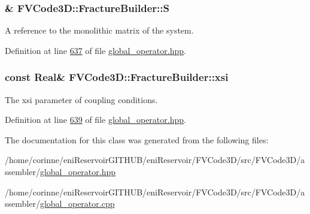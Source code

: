 \subsubsection[{\texorpdfstring{S}{S}}]{\& F\+V\+Code3\+D\+::\+Fracture\+Builder\+::S\hspace{0.3cm}{\ttfamily [private]}}\hypertarget{classFVCode3D_1_1FractureBuilder_a4863fe7c2507df5d6f30dbdac2a27c31}{}\label{classFVCode3D_1_1FractureBuilder_a4863fe7c2507df5d6f30dbdac2a27c31}


A reference to the monolithic matrix of the system. 



Definition at line \hyperlink{global__operator_8hpp_source_l00637}{637} of file \hyperlink{global__operator_8hpp_source}{global\+\_\+operator.\+hpp}.

\subsubsection[{\texorpdfstring{xsi}{xsi}}]{\setlength{\rightskip}{0pt plus 5cm}const {\bf Real}\& F\+V\+Code3\+D\+::\+Fracture\+Builder\+::xsi\hspace{0.3cm}{\ttfamily [private]}}\hypertarget{classFVCode3D_1_1FractureBuilder_add8696ef08b9dad08e62a0ef85a437b4}{}\label{classFVCode3D_1_1FractureBuilder_add8696ef08b9dad08e62a0ef85a437b4}


The xsi parameter of coupling conditions. 



Definition at line \hyperlink{global__operator_8hpp_source_l00639}{639} of file \hyperlink{global__operator_8hpp_source}{global\+\_\+operator.\+hpp}.



The documentation for this class was generated from the following files\+:\begin{DoxyCompactItemize}
\item 
/home/corinne/eni\+Reservoir\+G\+I\+T\+H\+U\+B/eni\+Reservoir/\+F\+V\+Code3\+D/src/\+F\+V\+Code3\+D/assembler/\hyperlink{global__operator_8hpp}{global\+\_\+operator.\+hpp}\item 
/home/corinne/eni\+Reservoir\+G\+I\+T\+H\+U\+B/eni\+Reservoir/\+F\+V\+Code3\+D/src/\+F\+V\+Code3\+D/assembler/\hyperlink{global__operator_8cpp}{global\+\_\+operator.\+cpp}\end{DoxyCompactItemize}
